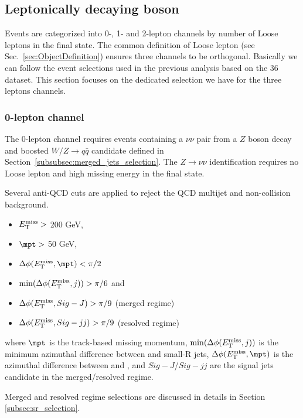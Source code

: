 \subsection{Leptonically decaying boson}
\label{subsec:leptons_selection}

Events are categorized into 0-, 1- and 2-lepton channels by number of Loose leptons in the final state. The common definition of Loose lepton (see Sec.~\ref{sec:ObjectDefinition}) ensures three channels to be orthogonal. 
Basically we can follow the event selections used in the previous analysis based on the 36\,\ifb dataset\cite{Ryzhov:2310214}.
This section focuses on the dedicated selection we have for the three leptons channels.

\subsubsection{0-lepton channel}
\label{subsubsec:0lep_event_selection}

The 0-lepton channel requires events containing a $\nu\nu$ pair from a $Z$ boson decay and boosted $W/Z \to q\bar{q}$ candidate defined in Section~\ref{subsubsec:merged_jets_selection}. 
The $Z \rightarrow \nu\nu$ identification requires no Loose lepton and high missing energy in the final state.

Several anti-QCD cuts are applied to reject the QCD multijet and non-collision background. 
\begin{itemize}
\item $E_{\mathrm{T}}^{\mathrm{miss}} >$ 200 GeV,
\item $\mpt >$ 50 GeV,
\item $\Delta\phi(\met,\mpt) < \pi/2$
\item $\min(\Delta\phi(E_{\mathrm{T}}^{\mathrm{miss}},j)) > \pi/6$ and 
\item $\Delta\phi(E_{\mathrm{T}}^{\mathrm{miss}}, Sig-J) > \pi/9$ (merged regime)
\item $\Delta\phi(E_{\mathrm{T}}^{\mathrm{miss}}, Sig-jj) > \pi/9$ (resolved regime)
\end{itemize}

where 
$\mpt$ is the track-based missing momentum, 
$\min(\Delta\phi(E_{\mathrm{T}}^{\mathrm{miss}},j))$ is the minimum azimuthal difference between \met and small-R jets, 
$\Delta\phi(\met, \mpt)$ is the azimuthal difference between \met and \mpt,
and $Sig-J$/$Sig-jj$ are the signal jets candidate in the merged/resolved regime. 

Merged and resolved regime selections are discussed in details in Section \ref{subsec:sr_selection}.

